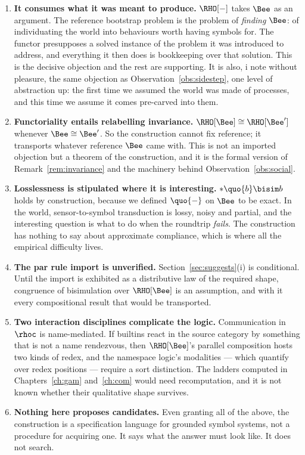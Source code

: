 \begin{enumerate}[label=\textbf{(\alph*)},leftmargin=2.4em]

\item \textbf{It consumes what it was meant to produce.}
$\RHO[-]$ takes $\Bee$ as an argument.
The reference bootstrap problem is the problem of \emph{finding}
$\Bee$: of individuating the world into behaviours worth having
symbols for.
The functor presupposes a solved instance of the problem it was
introduced to address, and everything it then does is bookkeeping
over that solution.
This is the decisive objection and the rest are supporting.
It is also, i note without pleasure, the same objection as
Observation~\ref{obs:sidestep}, one level of abstraction up: the
first time we assumed the world was made of processes, and this
time we assume it comes pre-carved into them.

\item \textbf{Functoriality entails relabelling invariance.}
$\RHO[\Bee] \cong \RHO[\Bee']$ whenever $\Bee \cong \Bee'$.
So the construction cannot fix reference; it transports whatever
reference $\Bee$ came with.
This is not an imported objection but a theorem of the
construction, and it is the formal version of
Remark~\ref{rem:invariance} and the machinery behind
Observation~\ref{obs:social}.

\item \textbf{Losslessness is stipulated where it is interesting.}
$*\quo{b} \bisim b$ holds by construction, because we defined
$\quo{-}$ on $\Bee$ to be exact.
In the world, sensor-to-symbol transduction is lossy, noisy and
partial, and the interesting question is what to do when the
roundtrip \emph{fails}.
The construction has nothing to say about approximate compliance,
which is where all the empirical difficulty lives.

\item \textbf{The par rule import is unverified.}
Section~\ref{sec:suggests}(i) is conditional.
Until the import is exhibited as a distributive law of the required
shape, congruence of bisimulation over $\RHO[\Bee]$ is an
assumption, and with it every compositional result that would be
transported.

\item \textbf{Two interaction disciplines complicate the logic.}
Communication in $\rhoc$ is name-mediated.
If builtins react in the source category by something that is not a
name rendezvous, then $\RHO[\Bee]$'s parallel composition hosts two
kinds of redex, and the namespace logic's modalities --- which
quantify over redex positions --- require a sort distinction.
The ladders computed in Chapters~\ref{ch:gam} and~\ref{ch:com}
would need recomputation, and it is not known whether their
qualitative shape survives.

\item \textbf{Nothing here proposes candidates.}
Even granting all of the above, the construction is a specification
language for grounded symbol systems, not a procedure for acquiring
one.
It says what the answer must look like.
It does not search.

\end{enumerate}

